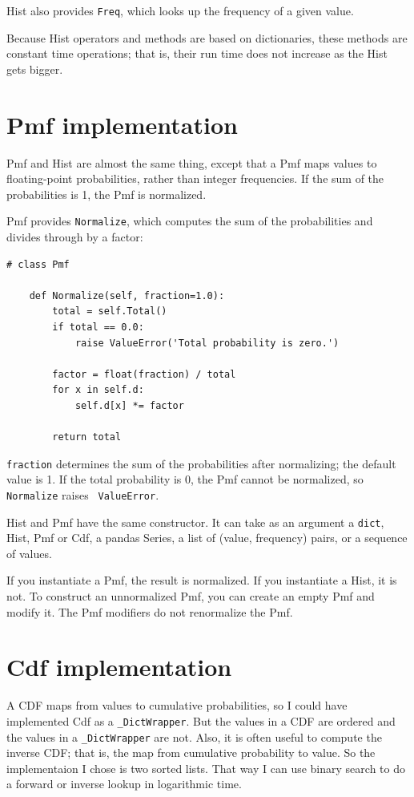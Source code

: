 \documentclass[12pt]{book}
\begin{document}
Hist also provides {\tt Freq}, which looks up the frequency
of a given value.

Because Hist operators and methods are based on dictionaries,
these methods are constant time operations;
that is, their run time does not increase as the Hist gets bigger.


\section{Pmf implementation}

Pmf and Hist are almost the same thing, except that a Pmf
maps values to floating-point probabilities, rather than integer
frequencies.  If the sum of the probabilities is 1, the Pmf is normalized.

Pmf provides {\tt Normalize}, which computes the sum of the
probabilities and divides through by a factor:

\begin{verbatim}
# class Pmf

    def Normalize(self, fraction=1.0):
        total = self.Total()
        if total == 0.0:
            raise ValueError('Total probability is zero.')

        factor = float(fraction) / total
        for x in self.d:
            self.d[x] *= factor

        return total
\end{verbatim}

{\tt fraction} determines the sum of the probabilities after
normalizing; the default value is 1.  If the total probability is 0,
the Pmf cannot be normalized, so {\tt Normalize} raises {\tt
  ValueError}.

Hist and Pmf have the same constructor.  It can take
as an argument a {\tt dict}, Hist, Pmf or Cdf, a pandas
Series, a list of (value, frequency) pairs, or a sequence of values.

If you instantiate a Pmf, the result is normalized.  If you
instantiate a Hist, it is not.  To construct an unnormalized Pmf,
you can create an empty Pmf and modify it.  The Pmf modifiers do
not renormalize the Pmf.


\section{Cdf implementation}

A CDF maps from values to cumulative probabilities, so I could have
implemented Cdf as a \verb"_DictWrapper".  But the values in a CDF are
ordered and the values in a \verb"_DictWrapper" are not.  Also, it is
often useful to compute the inverse CDF; that is, the map from
cumulative probability to value.  So the implementaion I chose is two
sorted lists.  That way I can use binary search to do a forward or
inverse lookup in logarithmic time.
\end{document}
